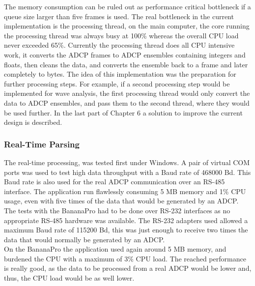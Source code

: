 The memory consumption can be ruled out as performance critical bottleneck if a queue size larger than five frames is used. The real bottleneck in the current implementation is the processing thread, on the main computer, the core running the processing thread was always busy at 100\% whereas the overall CPU load never exceeded 65\%. Currently the processing thread does all CPU intensive work, it converts the ADCP frames to ADCP ensembles containing integers and floats, then cleans the data, and converts the ensemble back to a frame and later completely to bytes. The idea of this implementation was the preparation for further processing steps. For example, if a second processing step would be implemented for wave analysis, the first processing thread would only convert the data to ADCP ensembles, and pass them to the second thread, where they would be used further. In the last part of Chapter 6 a solution to improve the current design is described.

\subsubsection{Real-Time Parsing} 
The real-time processing, was tested first under Windows. A pair of virtual COM ports was used to test high data throughput with a Baud rate of 468000 Bd. This Baud rate is also used for the real ADCP communication over an RS-485 interface. The application run flawlessly consuming 5 MB memory and 1\% CPU usage, even with five times of the data that would be generated by an ADCP.\\
The tests with the BananaPro had to be done over RS-232 interfaces as no appropriate RS-485 hardware was available. The RS-232 adapters used allowed a maximum Baud rate of 115200 Bd, this was just enough to receive two times the data that would normally be generated by an ADCP.\\
On the BananaPro the application used again around 5 MB memory, and burdened the CPU with a maximum of 3\% CPU load. The reached performance is really good, as the data to be processed from a real ADCP would be lower and, thus, the CPU load would be as well lower.
